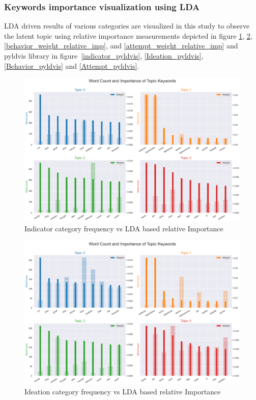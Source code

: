 \documentclass[sn-mathphys,Numbered]{sn-jnl}%
\theoremstyle{thmstyleone}%
\theoremstyle{thmstyletwo}%
\theoremstyle{thmstylethree}%
\begin{document}
\subsubsection{Keywords importance visualization using LDA}
LDA driven results of various categories are visualized in this study to observe the latent topic using relative importance measurements depicted in figure \ref{indicator_weight_relative_imp}, \ref{ideation_weight_relative_imp}, \ref{behavior_weight_relative_imp}, and \ref{attempt_weight_relative_imp} and pyldvis library in figure~\ref{indicator_pyldvis}, \ref{Ideation_pyldvis}, \ref{Behavior_pyldvis} and \ref{Attempt_pyldvis}.
\begin{figure}[H]
    \includegraphics[width=\textwidth]{indicator_weight_relative_imp.png}
    \caption{Indicator category frequency vs LDA based relative Importance}
    \label{indicator_weight_relative_imp}
\end{figure}
\begin{figure}[H]
    \includegraphics[width=\textwidth]{ideation_weight_relative_imp.png}
    \caption{Ideation category frequency vs LDA based relative Importance}
    \label{ideation_weight_relative_imp}
\end{figure}  
\end{document}
